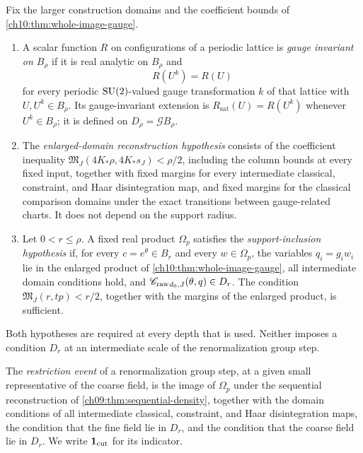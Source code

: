 \begin{definition}\label{ch10:def:image-and-overlap-gates}
Fix the larger construction domains and the coefficient bounds of \cref{ch10:thm:whole-image-gauge}.
\begin{enumerate}
\item A scalar function $R$ on configurations of a periodic lattice is \emph{gauge invariant on $B_\rho$} if it is real analytic on $B_\rho$ and
\[
 R(U^k)=R(U)
\]
for every periodic $\mathrm{SU}(2)$-valued gauge transformation $k$ of that lattice with $U,U^k\in B_\rho$. Its gauge-invariant extension is $R_{\mathrm{sat}}(U)=R(U^k)$ whenever $U^k\in B_\rho$; it is defined on $D_\rho=\mathcal GB_\rho$.
\item The \emph{enlarged-domain reconstruction hypothesis} consists of the coefficient inequality $\mathfrak M_J(4K_*\rho,4K_*s_J)<\rho/2$, including the column bounds at every fixed input, together with fixed margins for every intermediate classical, constraint, and Haar disintegration map, and fixed margins for the classical comparison domains under the exact transitions between gauge-related charts. It does not depend on the support radius.
\item Let $0<r\le\rho$. A fixed real product $\Omega_p$ satisfies the \emph{support-inclusion hypothesis} if, for every $c=e^\theta\in B_r$ and every $w\in\Omega_p$, the variables $q_i=g_iw_i$ lie in the enlarged product of \cref{ch10:thm:whole-image-gauge}, all intermediate domain conditions hold, and ${\mathscr C_{\mathrm{raw}}}_{d_0,J}(\theta,q)\in D_r$. The condition $\mathfrak M_J(r,tp)<r/2$, together with the margins of the enlarged product, is sufficient.
\end{enumerate}
Both hypotheses are required at every depth that is used. Neither imposes a condition $D_r$ at an intermediate scale of the renormalization group step.
\end{definition}

The \emph{restriction event} of a renormalization group step, at a given small representative of the coarse field, is the image of $\Omega_p$ under the sequential reconstruction of \cref{ch09:thm:sequential-density}, together with the domain conditions of all intermediate classical, constraint, and Haar disintegration maps, the condition that the fine field lie in $D_r$, and the condition that the coarse field lie in $D_r$. We write $\mathbf 1_{\mathrm{cut}}$ for its indicator.

